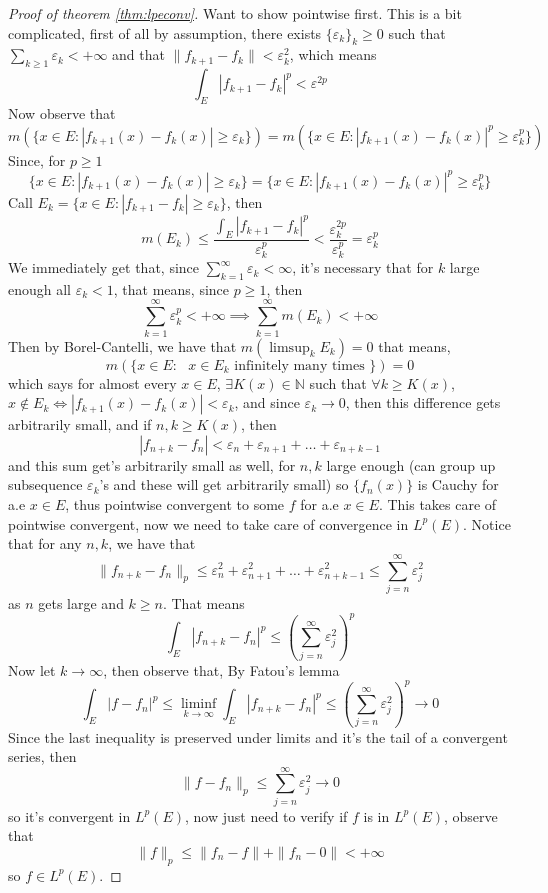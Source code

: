 \documentclass[13pt]{article}
\theoremstyle{definition} --- default
\theoremstyle{definition}
\theoremstyle{remark}
\begin{document}
	\begin{proof}[Proof of theorem \ref{thm:lpeconv}]
		Want to show pointwise first. This is a bit complicated, first of all by assumption, there exists $\{\varepsilon_k \}_k \geq 0 $ such that $\sum_{k \geq 1} \varepsilon_k < +\infty$ and that $\|f_{k+1} - f_k\| < \varepsilon_k^2$, which means 
		$$ 
		\int_{E} |f_{k+1} - f_k|^p < \varepsilon^{2p}
		$$
		Now observe that
		$$ m ( \{ x\in  E \colon |f_{k+1}(x)-f_k(x)| \geq \varepsilon_k \}) = m ( \{x \in E \colon |f_{k+1}(x)-f_k(x)|^p \geq \varepsilon_k^p\})
		$$ Since, for $p \geq 1$ 
		$$
		\{ x\in  E \colon |f_{k+1}(x)-f_k(x)| \geq \varepsilon_k \} =  \{x \in E \colon |f_{k+1}(x)-f_k(x)|^p \geq \varepsilon_k^p\}
		$$
		Call $E_k = \{ x\in  E \colon |f_{k+1}-f_k| \geq \varepsilon_k \}$, then 
		$$ m(E_k ) \leq \frac{\int_{E} |f_{k+1} - f_k|^p}{\varepsilon_k^p} < \frac{\varepsilon_k^{2p}}{\varepsilon_k^p} = \varepsilon_k^p$$
		We immediately get that, since $\sum_{k=1}^\infty \varepsilon_k < \infty$, it's necessary that for $k$ large enough all $\varepsilon_k < 1$, that means, since $p \geq 1$, then 
		$$
		\sum_{k=1}^\infty \varepsilon_k^p < +\infty \implies \sum_{k=1}^\infty m(E_k) < +\infty
		$$
		Then by Borel-Cantelli, we have that $m(\limsup_{k} E_k) = 0$ that means, 
		$$m(\{x \in E \colon \text{ $x \in E_k$ infinitely many times }\}) =0$$
		which says for almost every $x \in E$, $\exists K(x) \in \mathbb{N}$ such that $\forall k \geq K(x)$, $x \notin E_k \iff |f_{k+1}(x) - f_k(x)| < \varepsilon_k$, and since $\varepsilon_k \to 0$, then this difference gets arbitrarily small, and if $n,k \geq K(x)$, then 
		$$|f_{n+k} - f_n| < \varepsilon_n + \varepsilon_{n+1} + \ldots + \varepsilon_{n +k -1}$$
		and this sum get's arbitrarily small as well, for $n,k$ large enough (can group up subsequence $\varepsilon_k$'s and these will get arbitrarily small) so $\{f_n(x)\}$ is Cauchy for a.e $x \in E$, thus pointwise convergent to some $f$ for a.e $x \in E$. This takes care of pointwise convergent, now we need to take care of convergence in $L^p(E)$.
		Notice that for any $n,k$, we have that 
		$$\|f_{n+k} - f_n\|_p \leq \varepsilon_n^2 + \varepsilon_{n+1}^2 + \ldots + \varepsilon_{n+k-1}^2 \leq \sum_{j=n}^\infty \varepsilon_j^2 $$
		as $n$ gets large and $k\geq n$. That means
		$$ \int_{E} |f_{n+k} - f_n|^p \leq \left(\sum_{j=n}^\infty \varepsilon_j^2\right)^p $$
		Now let $k \to \infty$, then observe that, By Fatou's lemma
		$$ \int_{E} |f - f_n|^p  \leq \liminf_{k \to \infty} \int_{E} |f_{n+k} - f_n|^p \leq \left(\sum_{j=n}^\infty \varepsilon_j^2\right)^p \to 0
		$$
		Since the last inequality is preserved under limits and it's the tail of a convergent series, then 
		$$
		\|f - f_n\|_p \leq \sum_{j=n}^\infty \varepsilon_j^2 \to 0
		$$
		so it's convergent in $L^p(E)$, now just need to verify if $f$ is in $L^p(E)$, observe that 
		$$\|f\|_p \leq \|f_n - f\| + \|f_n -0\| < +\infty$$
		so $f \in L^p(E)$.

	\end{proof}
\end{document}

